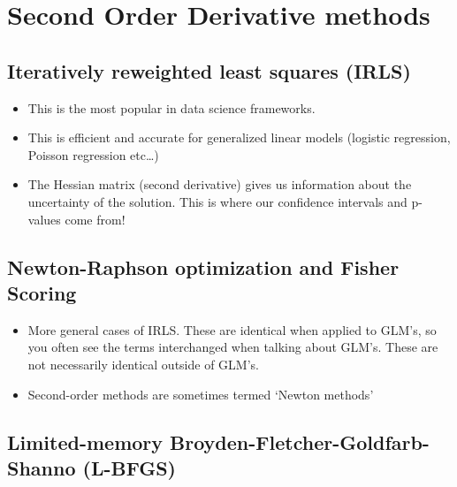 \documentclass[fontset=fandol,zihao=false,scheme=chinese,heading=true,UTF8]{ctexbook}
\providecommand{\tightlist}{%
  \setlength{\itemsep}{0pt}\setlength{\parskip}{0pt}}
\begin{document}
\hypertarget{second-order-derivative-methods}{%
\section{Second Order Derivative methods}\label{second-order-derivative-methods}}

\hypertarget{iteratively-reweighted-least-squares-irls}{%
\subsection{Iteratively reweighted least squares (IRLS)}\label{iteratively-reweighted-least-squares-irls}}

\begin{itemize}
\tightlist
\item
  This is the most popular in data science frameworks.
\item
  This is efficient and accurate for generalized linear models (logistic regression, Poisson regression etc\ldots{})
\item
  The Hessian matrix (second derivative) gives us information about the uncertainty of the solution. This is where our confidence intervals and p-values come from!
\end{itemize}

\hypertarget{newton-raphson-optimization-and-fisher-scoring}{%
\subsection{Newton-Raphson optimization and Fisher Scoring}\label{newton-raphson-optimization-and-fisher-scoring}}

\begin{itemize}
\tightlist
\item
  More general cases of IRLS. These are identical when applied to GLM's, so you often see the terms interchanged when talking about GLM's. These are not necessarily identical outside of GLM's.
\item
  Second-order methods are sometimes termed `Newton methods'
\end{itemize}

\hypertarget{limited-memory-broyden-fletcher-goldfarb-shanno-l-bfgs}{%
\subsection{Limited-memory Broyden-Fletcher-Goldfarb-Shanno (L-BFGS)}\label{limited-memory-broyden-fletcher-goldfarb-shanno-l-bfgs}}
\end{document}
